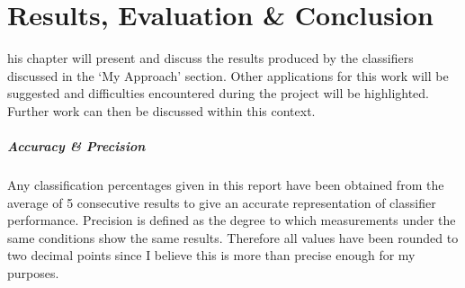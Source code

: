 %
%

\let\textcircled=\pgftextcircled
\chapter{Results, Evaluation \& Conclusion}
his chapter will present and discuss the results produced by the classifiers discussed in the `My Approach' section. Other applications for this work will be suggested and difficulties encountered during the project will be highlighted. Further work can then be discussed within this context. 

\paragraph{Accuracy \& Precision}
Any classification percentages given in this report have been obtained from the average of 5 consecutive results to give an accurate representation of classifier performance. Precision is defined as the degree to which measurements under the same conditions show the same results. Therefore all values have been rounded  to two decimal points since I believe this is more than precise enough for my purposes.

